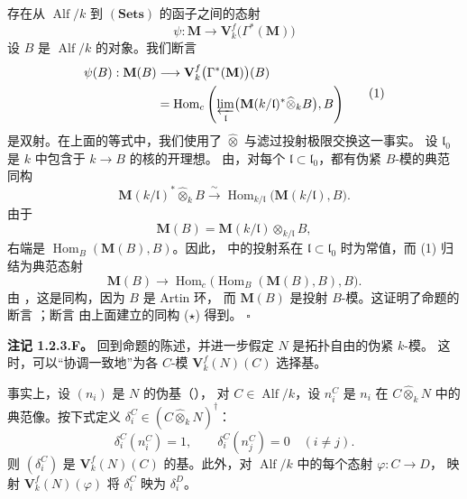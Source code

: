 存在从 \(\operatorname{Alf}/k\) 到 \((\mathbf{Sets})\) 的函子之间的态射
\[
  \psi:
  \mathbf M\longrightarrow
  \mathbf V_k^f\bigl(\Gamma^*(\mathbf M)\bigr)
\]
设 \(B\) 是 \(\operatorname{Alf}/k\) 的对象。我们断言
\begin{equation}
  \begin{split}
  \psi(B):\mathbf M(B)
  &\longrightarrow
  \mathbf V_k^f\bigl(\Gamma^*(\mathbf M)\bigr)(B)\\
  &=
  \operatorname{Hom}_c
  \left(
    \varprojlim_{\mathfrak l}
      \bigl(\mathbf M(k/\mathfrak l)^*
        \widehat{\otimes}_kB\bigr),
    B
  \right)
  \end{split}
  \tag{1}
  \label{sga3:VIIB:1.2.3:eq1}
\end{equation}
是双射。在上面的等式中，我们使用了 \(\widehat{\otimes}\) 与滤过投射极限交换这一事实。
设 \(\mathfrak l_0\) 是 \(k\) 中包含于 \(k\longrightarrow B\) 的核的开理想。
由，对每个
\(\mathfrak l\subset\mathfrak l_0\)，都有伪紧 \(B\)-模的典范同构
\[
  \mathbf M(k/\mathfrak l)^*\widehat{\otimes}_kB
  \xrightarrow{\ \sim\ }
  \operatorname{Hom}_{k/\mathfrak l}
    \bigl(\mathbf M(k/\mathfrak l),B\bigr).
\]
由于
\[
  \mathbf M(B)
  =
  \mathbf M(k/\mathfrak l)
    \otimes_{k/\mathfrak l}B,
\]
右端是 \(\operatorname{Hom}_B(\mathbf M(B),B)\)。因此，
\textup{} 中的投射系在
\(\mathfrak l\subset\mathfrak l_0\) 时为常值，而 \textup{(1)} 归结为典范态射
\[
  \mathbf M(B)
  \longrightarrow
  \operatorname{Hom}_c
  \bigl(\operatorname{Hom}_B(\mathbf M(B),B),B\bigr).
\]
由 ，这是同构，因为 \(B\) 是 Artin 环，
而 \(\mathbf M(B)\) 是投射 \(B\)-模。这证明了命题的断言
\textup{}；断言
\textup{} 由上面建立的同构
\textup{(\(\star\))} 得到。
\hfill\(\square\)

\medskip
\noindent\textbf{注记 1.2.3.F。}
\label{sga3:VIIB:1.2.3.F}
回到命题的陈述，并进一步假定 \(N\) 是拓扑自由的伪紧 \(k\)-模。
这时，可以“协调一致地”为各 \(C\)-模 \(\mathbf V_k^f(N)(C)\) 选择基。

事实上，设 \((n_i)\) 是 \(N\) 的伪基（），
对 \(C\in\operatorname{Alf}/k\)，设 \(n_i^C\) 是 \(n_i\) 在
\(C\widehat{\otimes}_kN\) 中的典范像。按下式定义
\(\delta_i^C\in(C\widehat{\otimes}_kN)^\dagger\)：
\[
  \delta_i^C(n_i^C)=1,
  \qquad
  \delta_i^C(n_j^C)=0\quad(i\ne j).
\]
则 \((\delta_i^C)\) 是 \(\mathbf V_k^f(N)(C)\) 的基。此外，对
\(\operatorname{Alf}/k\) 中的每个态射 \(\varphi:C\longrightarrow D\)，
映射 \(\mathbf V_k^f(N)(\varphi)\) 将 \(\delta_i^C\) 映为 \(\delta_i^D\)。

